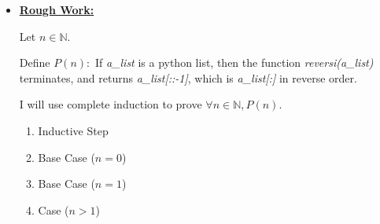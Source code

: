 \documentclass[12pt]{article}
\begin{document}
\begin{itemize}
    \item

    \begin{mdframed}
    \underline{\textbf{Rough Work:}}

    \bigskip

    Let $n \in \mathbb{N}$.

    \bigskip

    Define $P(n):$ If \textit{a\_list} is a python list, then the function
    \textit{reversi(a\_list)} terminates, and returns \textit{a\_list[::-1]},
    which is \textit{a\_list[:]} in reverse order.

    \bigskip

    I will use complete induction to prove $\forall n \in \mathbb{N}, P(n)$.

    \begin{enumerate}[1.]
        \item Inductive Step
        \item Base Case ($n = 0$)
        \item Base Case ($n = 1$)
        \item Case ($n > 1$)
    \end{enumerate}



    \end{mdframed}
\end{itemize}
\end{document}
